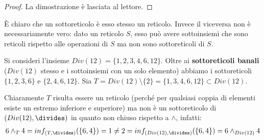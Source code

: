 \begin{proof}
	La dimostrazione è lasciata al lettore.
\end{proof}
È chiaro che un sottoreticolo è esso stesso un reticolo. Invece il viceversa non è necessariamente vero:  dato un reticolo $S$, esso può avere sottoinsiemi che sono reticoli rispetto alle operazioni di $S$ ma non sono sottoreticoli di $S$.
\begin{example}
	 Si consideri l'insieme $Div(12)=\{1,2,3,4,6,12\}$. Oltre ai \textbf{sottoreticoli banali} ($Div(12)$ stesso e i sottoinsiemi con un solo elemento) abbiamo i sottoreticoli $\{1,2,3,6\}$ e $\{2,4,6,12\}$. Sia $T=Div(12) \setminus \{2\} = \{1,3,4,6,12\} \subset Div(12)$.

	\begin{center}
		\begin{minipage}{.45\textwidth}
			\centering
		\end{minipage}
		\hfil
		\begin{minipage}{.45\textwidth}
			\centering
		\end{minipage}
	\end{center}
 Chiaramente $T$ risulta essere un reticolo (perché per qualsiasi coppia di elementi esiste un estremo inferiore e superiore) ma non è un sottoreticolo di $(Div(12), \divides )$ in quanto non chiuso rispetto a $\wedge$, infatti:
 \begin{align*}
 	6 \wedge_{T} 4 = inf_{(T,\divides)}(\{6,4\}) =1 \neq 2 = inf_{(Div(12),\divides)}(\{6,4\}) = 6 \wedge_{Div(12)} 4
\end{align*}
\end{example}

